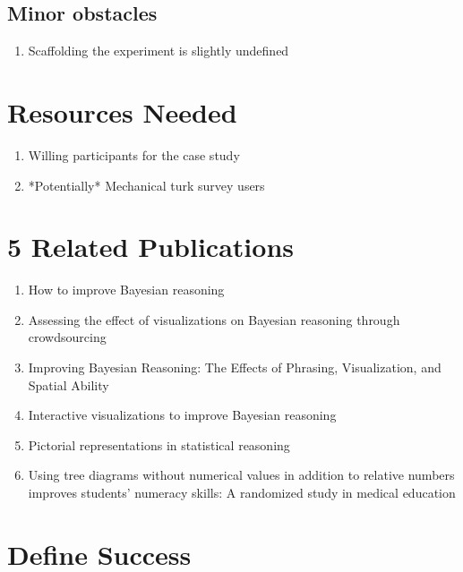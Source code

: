 \documentclass{proc}
\begin{document}
\subsection{Minor obstacles}

\begin{enumerate}
    \item Scaffolding the experiment is slightly undefined
\end{enumerate}

\section{Resources Needed}
\begin{enumerate}
    \item Willing participants for the case study
    \item *Potentially* Mechanical turk survey users
\end{enumerate}


\section{5 Related Publications}
\begin{enumerate}
    \item How to improve Bayesian reasoning \cite{Gigerenzer1995} \item
    Assessing the effect of visualizations on Bayesian reasoning through
    crowdsourcing \cite{Micallef2012} 

    \item Improving Bayesian Reasoning: The
    Effects of Phrasing, Visualization, and Spatial Ability \cite{Ottley2016}
    \item Interactive visualizations to improve Bayesian reasoning
    \cite{Tsai2011} 

    \item Pictorial representations in statistical reasoning
    \cite{Brase2009} 

    \item Using tree diagrams without numerical values in
    addition to relative numbers improves students' numeracy skills: A
    randomized study in medical education \cite{Friederichs2014}

\end{enumerate}

\section{Define Success}
\end{document}
